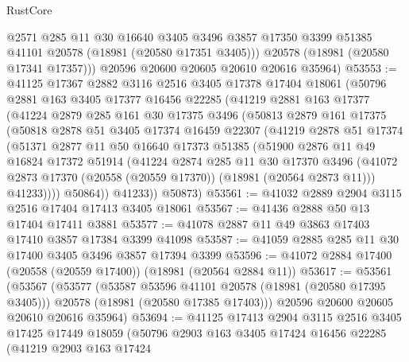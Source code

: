 \begin{lexlean}{RustCore}
\begin{coremodule}
          @2571
          @285
          @11
          @30
          @16640
          @3405
          @3496
          @3857
          @17350
          @3399
          @51385
          @41101
          @20578
          (@18981 (@20580 @17351 @3405)))
        @20578
        (@18981 (@20580 @17341 @17357)))
      @20596
      @20600
      @20605
      @20610
      @20616
      @35964)
@53553 := @41125
    @17367
    @2882
    @3116
    @2516
    @3405
    @17378
    @17404
    @18061
    (@50796
      @2881
      @163
      @3405
      @17377
      @16456
      @22285
      (@41219
        @2881
        @163
        @17377
        (@41224
          @2879
          @285
          @161
          @30
          @17375
          @3496
          (@50813
            @2879
            @161
            @17375
            (@50818
              @2878
              @51
              @3405
              @17374
              @16459
              @22307
              (@41219
                @2878
                @51
                @17374
                (@51371
                  @2877
                  @11
                  @50
                  @16640
                  @17373
                  @51385
                  (@51900
                    @2876
                    @11
                    @49
                    @16824
                    @17372
                    @51914
                    (@41224
                      @2874
                      @285
                      @11
                      @30
                      @17370
                      @3496
                      (@41072 @2873 @17370 (@20558 (@20559 @17370)) (@18981 (@20564 @2873 @11)))
                      @41233))))
              @50864))
          @41233))
      @50873)
@53561 := @41032 @2889 @2904 @3115 @2516 @17404 @17413 @3405 @18061
@53567 := @41436 @2888 @50 @13 @17404 @17411 @3881
@53577 := @41078 @2887 @11 @49 @3863 @17403 @17410 @3857 @17384 @3399 @41098
@53587 := @41059 @2885 @285 @11 @30 @17400 @3405 @3496 @3857 @17394 @3399
@53596 := @41072 @2884 @17400 (@20558 (@20559 @17400)) (@18981 (@20564 @2884 @11))
@53617 := @53561
    (@53567
      (@53577
        (@53587 @53596 @41101 @20578 (@18981 (@20580 @17395 @3405)))
        @20578
        (@18981 (@20580 @17385 @17403)))
      @20596
      @20600
      @20605
      @20610
      @20616
      @35964)
@53694 := @41125
    @17413
    @2904
    @3115
    @2516
    @3405
    @17425
    @17449
    @18059
    (@50796
      @2903
      @163
      @3405
      @17424
      @16456
      @22285
      (@41219
        @2903
        @163
        @17424

\end{coremodule}
\end{lexlean}
